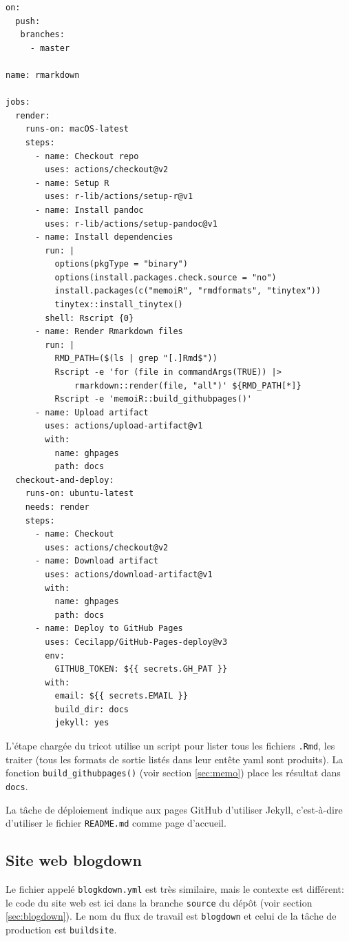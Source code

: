 \documentclass[
  12pt,
  french,
  a4paper,
  extrafontsizes,onecolumn,openright
  ]{memoir}
\begin{document}
\begin{verbatim}
on:
  push:
   branches:
     - master

name: rmarkdown

jobs:
  render:
    runs-on: macOS-latest
    steps:
      - name: Checkout repo
        uses: actions/checkout@v2
      - name: Setup R
        uses: r-lib/actions/setup-r@v1
      - name: Install pandoc
        uses: r-lib/actions/setup-pandoc@v1
      - name: Install dependencies
        run: |
          options(pkgType = "binary")
          options(install.packages.check.source = "no")
          install.packages(c("memoiR", "rmdformats", "tinytex"))
          tinytex::install_tinytex()
        shell: Rscript {0}
      - name: Render Rmarkdown files
        run: |
          RMD_PATH=($(ls | grep "[.]Rmd$"))
          Rscript -e 'for (file in commandArgs(TRUE)) |>
              rmarkdown::render(file, "all")' ${RMD_PATH[*]}
          Rscript -e 'memoiR::build_githubpages()'
      - name: Upload artifact
        uses: actions/upload-artifact@v1
        with:
          name: ghpages
          path: docs
  checkout-and-deploy:
    runs-on: ubuntu-latest
    needs: render
    steps:
      - name: Checkout
        uses: actions/checkout@v2
      - name: Download artifact
        uses: actions/download-artifact@v1
        with:
          name: ghpages
          path: docs
      - name: Deploy to GitHub Pages
        uses: Cecilapp/GitHub-Pages-deploy@v3
        env:
          GITHUB_TOKEN: ${{ secrets.GH_PAT }}
        with:
          email: ${{ secrets.EMAIL }}
          build_dir: docs
          jekyll: yes
\end{verbatim}

L'étape chargée du tricot utilise un script pour lister tous les fichiers \texttt{.Rmd}, les traiter (tous les formats de sortie listés dans leur entête yaml sont produits).
La fonction \texttt{build\_githubpages()} (voir section \ref{sec:memo}) place les résultat dans \texttt{docs}.

La tâche de déploiement indique aux pages GitHub d'utiliser Jekyll, c'est-à-dire d'utiliser le fichier \texttt{README.md} comme page d'accueil.

\hypertarget{sec:blogdown-ci}{%
\subsection{Site web blogdown}\label{sec:blogdown-ci}}

Le fichier appelé \texttt{blogkdown.yml} est très similaire, mais le contexte est différent: le code du site web est ici dans la branche \texttt{source} du dépôt (voir section \ref{sec:blogdown}).
Le nom du flux de travail est \texttt{blogdown} et celui de la tâche de production est \texttt{buildsite}.
\end{document}
